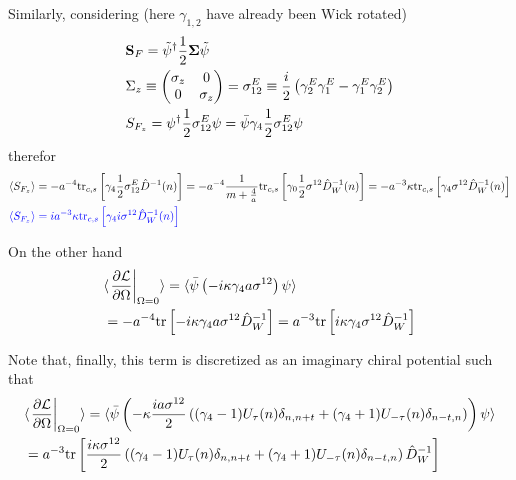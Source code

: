 Similarly, considering (here $\gamma _{1,2}$ have already been Wick rotated)
\begin{equation}
\begin{split}
&{\bf S}_F=\tilde{\psi}^{\dagger}\frac{1}{2}{\bf \Sigma}\tilde{\psi}\\
&\Sigma_z\equiv \begin{pmatrix}
                  \sigma _z & 0 \\
                  0 & \sigma _z
                \end{pmatrix}=\sigma ^E _{12}\equiv \frac{i}{2}\left(\gamma ^E_2\gamma ^E_1-\gamma ^E_1\gamma ^E_2\right)\\
&S_{F_z}=\psi^{\dagger}\frac{1}{2}\sigma ^E_{12}\psi=\bar{\psi}\gamma _4\frac{1}{2}\sigma ^E_{12}\psi\\
\end{split}
\end{equation}
therefor
\begin{equation}
\begin{split}
&\langle S_{F_z}\rangle=-a^{-4}{\rm tr}_{c,s}\left[\gamma _4\frac{1}{2}\sigma ^E_{12}\hat{D}^{-1}(n)\right]=-a^{-4}\frac{1}{m+\frac{4}{a}}{\rm tr}_{c,s}\left[\gamma _0\frac{1}{2}\sigma ^{12}\hat{D}_W^{-1}(n)\right]=-a^{-3}\kappa {\rm tr}_{c,s}\left[\gamma _4\sigma ^{12}\hat{D}_W^{-1}(n)\right]\\
&\textcolor[rgb]{0,0,1}{\langle S_{F_z}\rangle=ia^{-3}\kappa {\rm tr}_{c,s}\left[\gamma _4i\sigma ^{12}\hat{D}_W^{-1}(n)\right]}\\
\end{split}
\end{equation}

On the other hand
\begin{equation}
\begin{split}
&\langle\left.\frac{\partial \mathcal{L}}{\partial \Omega}\right|_{\Omega=0}\rangle=\langle \bar{\psi}\left(-i\kappa \gamma _4 a \sigma ^{12}\right)\psi \rangle\\
&=-a^{-4}{\rm tr}\left[-i\kappa \gamma _4 a \sigma ^{12}\hat{D}_W^{-1}\right]=a^{-3}{\rm tr}\left[i\kappa \gamma _4  \sigma ^{12}\hat{D}_W^{-1}\right]\\
\end{split}
\end{equation}

Note that, finally, this term is discretized as an imaginary chiral potential such that
\begin{equation}
\begin{split}
&\langle\left.\frac{\partial \mathcal{L}}{\partial \Omega}\right|_{\Omega=0}\rangle=\langle \bar{\psi}\left(-\kappa \frac{ia \sigma ^{12}}{2}\left((\gamma _4-1)U_{\tau}(n)\delta _{n,n+t} +(\gamma _4+1) U_{-\tau}(n)\delta _{n-t,n}\right)\right)\psi \rangle\\
&=a^{-3}{\rm tr}\left[\frac{i\kappa \sigma ^{12}}{2} \left((\gamma _4-1)U_{\tau}(n)\delta _{n,n+t} +(\gamma _4+1) U_{-\tau}(n)\delta _{n-t,n}\right)\hat{D}_W^{-1}\right]\\
\end{split}
\end{equation}

